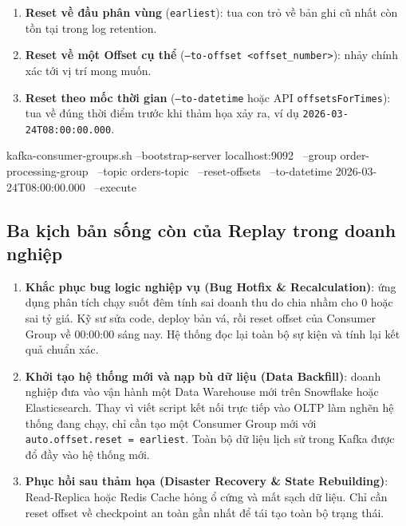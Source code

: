 \documentclass[12pt]{article}
\begin{document}
\begin{enumerate}
    \item \textbf{Reset về đầu phân vùng} (\texttt{earliest}): tua con trỏ về bản ghi cũ nhất còn tồn tại trong log retention.
    \item \textbf{Reset về một Offset cụ thể} (\texttt{--to-offset <offset\_number>}): nhảy chính xác tới vị trí mong muốn.
    \item \textbf{Reset theo mốc thời gian} (\texttt{--to-datetime} hoặc API \texttt{offsetsForTimes}): tua về đúng thời điểm trước khi thảm họa xảy ra, ví dụ \texttt{2026-03-24T08:00:00.000}.
\end{enumerate}

\begin{aivnplainbox}
kafka-consumer-groups.sh --bootstrap-server localhost:9092 \
  --group order-processing-group \
  --topic orders-topic \
  --reset-offsets \
  --to-datetime 2026-03-24T08:00:00.000 \
  --execute
\end{aivnplainbox}

\subsection{Ba kịch bản sống còn của Replay trong doanh nghiệp}

\begin{enumerate}
    \item \textbf{Khắc phục bug logic nghiệp vụ (Bug Hotfix \& Recalculation)}: ứng dụng phân tích chạy suốt đêm tính sai doanh thu do chia nhầm cho 0 hoặc sai tỷ giá. Kỹ sư sửa code, deploy bản vá, rồi reset offset của Consumer Group về 00:00:00 sáng nay. Hệ thống đọc lại toàn bộ sự kiện và tính lại kết quả chuẩn xác.
    \item \textbf{Khởi tạo hệ thống mới và nạp bù dữ liệu (Data Backfill)}: doanh nghiệp đưa vào vận hành một Data Warehouse mới trên Snowflake hoặc Elasticsearch. Thay vì viết script kết nối trực tiếp vào OLTP làm nghẽn hệ thống đang chạy, chỉ cần tạo một Consumer Group mới với \texttt{auto.offset.reset = earliest}. Toàn bộ dữ liệu lịch sử trong Kafka được đổ đầy vào hệ thống mới.
    \item \textbf{Phục hồi sau thảm họa (Disaster Recovery \& State Rebuilding)}: Read-Replica hoặc Redis Cache hỏng ổ cứng và mất sạch dữ liệu. Chỉ cần reset offset về checkpoint an toàn gần nhất để tái tạo toàn bộ trạng thái.
\end{enumerate}
\end{document}
